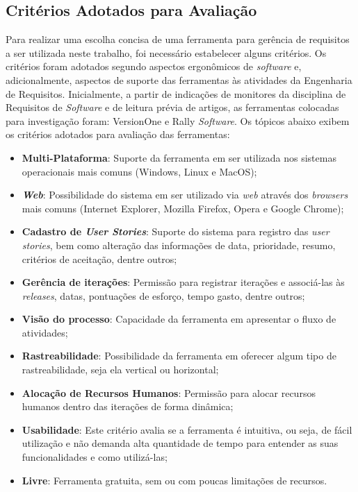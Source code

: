 		\subsection[Critérios Adotados para Avaliação]{Critérios Adotados para Avaliação}
		\label{subsec:ferramenta_analise_criterios}
			Para realizar uma escolha concisa de uma ferramenta para gerência de requisitos a ser utilizada neste trabalho, foi necessário estabelecer alguns critérios. Os critérios foram adotados segundo aspectos ergonômicos de \emph{software} \cite{ergolist} e, adicionalmente, aspectos de suporte das ferramentas às atividades da Engenharia de Requisitos. Inicialmente, a partir de indicações de monitores da disciplina de Requisitos de \emph{Software} e de leitura prévia de artigos, as ferramentas colocadas para investigação foram: VersionOne e Rally \emph{Software}. Os tópicos abaixo exibem os critérios adotados para avaliação das ferramentas:
			\begin{itemize}
				\item{\textbf{Multi-Plataforma}: Suporte da ferramenta em ser utilizada nos sistemas operacionais mais comuns (Windows, Linux e MacOS);}
				\item{\textbf{\emph{Web}}: Possibilidade do sistema em ser utilizado via \emph{web} através dos \emph{browsers} mais comuns (Internet Explorer, Mozilla Firefox, Opera e Google Chrome);}
				\item{\textbf{Cadastro de \emph{User Stories}}: Suporte do sistema para registro das \emph{user stories}, bem como alteração das informações de data, prioridade, resumo, critérios de aceitação, dentre outros;}
				\item{\textbf{Gerência de iterações}: Permissão para registrar iterações e associá-las às \emph{releases}, datas, pontuações de esforço, tempo gasto, dentre outros;}
				\item{\textbf{Visão do processo}: Capacidade da ferramenta em apresentar o fluxo de atividades;}
				\item{\textbf{Rastreabilidade}: Possibilidade da ferramenta em oferecer algum tipo de rastreabilidade, seja ela vertical ou horizontal;}
				\item{\textbf{Alocação de Recursos Humanos}: Permissão para alocar recursos humanos dentro das iterações de forma dinâmica;}
				\item{\textbf{Usabilidade}: Este critério avalia se a ferramenta é intuitiva, ou seja, de fácil utilização e não demanda alta quantidade de tempo para entender as suas funcionalidades e como utilizá-las;}
				\item{\textbf{Livre}: Ferramenta gratuita, sem ou com poucas limitações de recursos.}
			\end{itemize}

